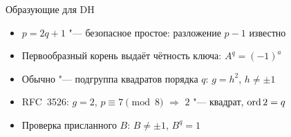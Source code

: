 \documentclass{ca-slides}
\begin{document}
\begin{canvasframe}{Образующие для DH}
  \begin{itemize}
    \item $p = 2q + 1$ "--- безопасное простое: разложение $p - 1$ известно
    \item Первообразный корень выдаёт чётность ключа: $A^q = (-1)^a$
    \item Обычно "--- подгруппа квадратов порядка $q$: $g = h^2$, $h \ne \pm 1$
    \item RFC~3526: $g = 2$, $p \equiv 7 \pmod 8$ $\Rightarrow$ $2$ "--- квадрат, $\operatorname{ord} 2 = q$
    \item Проверка присланного $B$: $B \ne \pm 1$, $B^q = 1$
  \end{itemize}
  \penspace[0.15\textheight]
\end{canvasframe}
\end{document}
